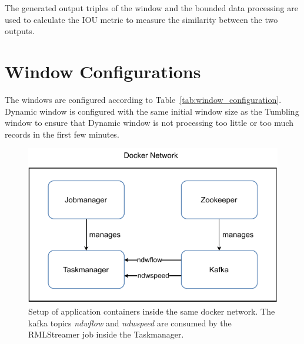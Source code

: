 The generated output triples of the window and the bounded data processing are 
used to calculate the IOU metric to measure the similarity between the two outputs.    


\section{Window Configurations}
\label{sec:Window Configurations}
The windows are configured according to Table~\ref{tab:window_configuration}. 
Dynamic window is configured with the same initial window size as the 
Tumbling window to ensure that Dynamic window is not processing too little or too much 
records in the first few minutes. 


\begin{figure}[htpb]
    \centering
    \includegraphics[width=0.8\linewidth]{fig/docker_setup.pdf}
    \caption{Setup of application containers inside the same docker network. 
    The kafka topics \emph{ndwflow} and \emph{ndwspeed} are consumed by the 
RMLStreamer job inside the Taskmanager. 
}%
    \label{fig:docker_setup}
\end{figure}

